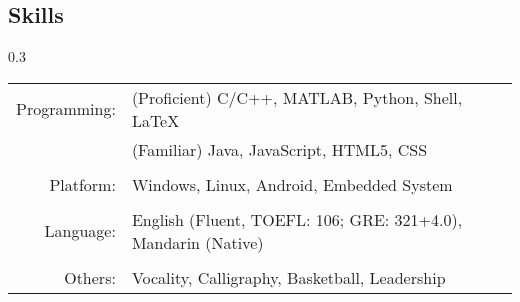\documentclass[a4paper,10pt]{article}
\begin{document}
\begin{CJK}{GBK}{song}
\section{Skills}
\begin{spacing} {0.3}
\begin{tabular}{r|p{12cm}}

Programming: &(Proficient) C/C++, MATLAB, Python, Shell, \LaTeX\\
&(Familiar) Java, JavaScript, HTML5, CSS\\
\multicolumn{2}{c}{} \\
Platform: &Windows, Linux, Android, Embedded System\\
\multicolumn{2}{c}{} \\
Language: &English (Fluent, TOEFL: 106; GRE: 321+4.0), Mandarin (Native)\\
\multicolumn{2}{c}{} \\
Others: &Vocality, Calligraphy, Basketball, Leadership\\
\end{tabular}
\end{spacing}


\end{CJK}
\end{document}
